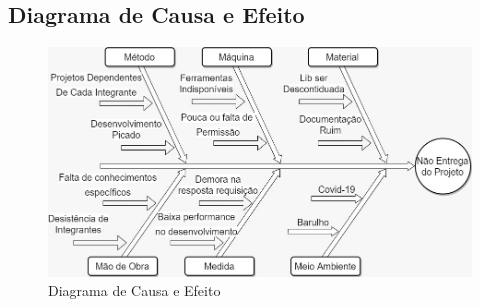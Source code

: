 {{\subsection{Diagrama de Causa e Efeito}
\begin{figure}[htb]
	\caption{\label{causaeefeito1}Diagrama de Causa e Efeito}
	\begin{center}
		\includegraphics[scale=0.55]{./Figuras/Diagrama causa e efeito.jpeg}
	\end{center}
\end{figure}
}

}
